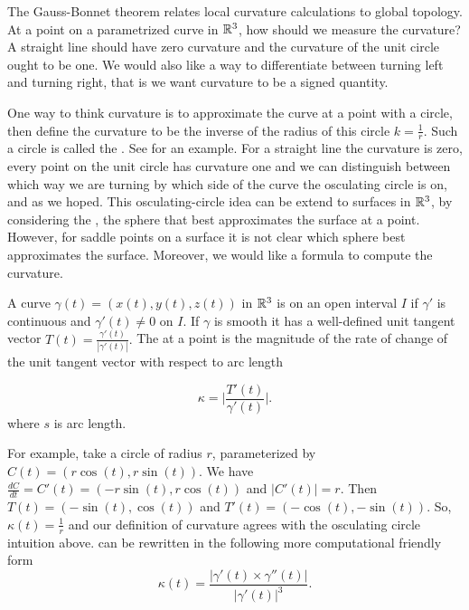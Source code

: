 
The Gauss-Bonnet theorem relates local curvature calculations
to global topology. 
At a point on a parametrized curve  in $\mathbb{R}^3$,
how should we measure the curvature?
A straight line should have zero curvature and the curvature of the unit circle ought to be one.
We would also like a way to differentiate
between turning left and turning right, that is we want curvature to be a signed quantity.

One way to think curvature is to approximate the curve at a point with a circle,
then define the curvature to be the inverse of the radius of this circle $k=\frac{1}{r}$.
Such a circle is called the .
See  for an example.
For a straight line the curvature is zero, 
every point on the unit circle has curvature one 
and we can distinguish between
which way we are turning by which side of the curve the osculating circle is on,
 and as we hoped.
 This osculating-circle idea can be extend
to  surfaces in $\mathbb{R}^3$, by considering the ,
 the sphere that best approximates the surface at a point.
However, for saddle points on a surface it is not clear which sphere
best approximates the surface. Moreover, we would like a formula to compute the curvature.

A curve $\gamma(t)=(x(t),y(t),z(t))$ in $\mathbb{R}^3$ is  on an open interval $I$
if $\gamma'$ is continuous and $\gamma'(t)\neq 0$ on $I$. 
If $\gamma$ is smooth it has a well-defined unit tangent vector $T(t)=\frac{\gamma'(t)}{|\gamma'(t)|}.$
The  at a point is the magnitude of the rate of change of the unit tangent vector with 
respect to arc length

\begin{equation} \label{eqn:kappa}
\kappa=\bigg  | \frac{T'(t)}{\gamma'(t)}\bigg |.
\end{equation}
where $s$ is arc length.

For example, take a circle of radius $r$, parameterized by $C(t)=\left(r\cos(t),r\sin(t)\right)$.
We have $\frac{dC}{dt}=C'(t)=\left(-r\sin(t),r\cos(t)\right)$ and $|C'(t)|=r$.
Then $T(t)=\left(-\sin(t),\cos(t)\right)$ and $T'(t)=\left(-\cos(t),-\sin(t)\right)$.
So, $\kappa(t)=\frac{1}{r}$ and our definition of curvature agrees with the
osculating circle intuition above. 
 can be rewritten in the following more computational friendly form 
\begin{equation} \label{eqn:kappa1}
\kappa(t)=\frac{|\gamma'(t)\times \gamma''(t)|}{|\gamma'(t)|^3}.
\end{equation}

